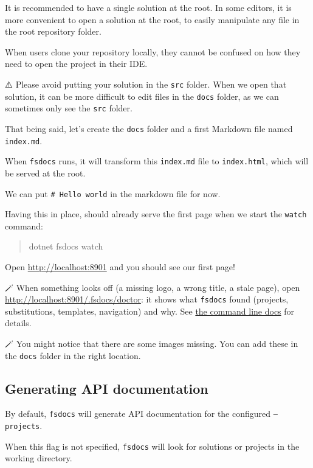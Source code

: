 \documentclass{article}
\begin{document}
It is recommended to have a single solution at the root. In some editors, it is more convenient to open a solution at the root, to easily manipulate any file in the root repository folder.

When users clone your repository locally, they cannot be confused on how they need to open the project in their IDE.


⚠️ Please avoid putting your solution in the \texttt{src} folder. When we open that solution, it can be more difficult to edit files in the \texttt{docs} folder, as we can sometimes only see the \texttt{src} folder.


That being said, let's create the \texttt{docs} folder and a first Markdown file named \texttt{index.md}.

When \texttt{fsdocs} runs, it will transform this \texttt{index.md} file to \texttt{index.html}, which will be served at the root.


We can put \texttt{\# Hello world} in the markdown file for now.


Having this in place, should already serve the first page when we start the \texttt{watch} command:
\begin{quote}


dotnet fsdocs watch
\end{quote}



Open \href{http://localhost:8901}{\href{http://localhost:8901}{http://localhost:8901}} and you should see our first page!


🪄 When something looks off (a missing logo, a wrong title, a stale page), open \href{http://localhost:8901/.fsdocs/doctor}{\href{http://localhost:8901/.fsdocs/doctor}{http://localhost:8901/.fsdocs/doctor}}:
it shows what \texttt{fsdocs} found (projects, substitutions, templates, navigation) and why. See \href{commandline.html}{the command line docs} for details.


🪄 You might notice that there are some images missing. You can add these in the \texttt{docs} folder in the right location.
\subsection*{Generating API documentation}



By default, \texttt{fsdocs} will generate API documentation for the configured \texttt{--projects}.

When this flag is not specified, \texttt{fsdocs} will look for solutions or projects in the working directory.
\end{document}

